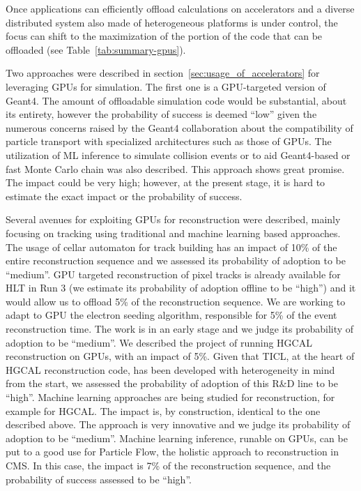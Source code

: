 \documentclass{cmspaper}
\begin{document}
Once applications can efficiently offload calculations on accelerators  and a diverse distributed system also made of heterogeneous platforms is under control, the focus can shift to the maximization of the portion of the code that can be offloaded (see Table~\ref{tab:summary-gpus}).

Two approaches were described in section~\ref{sec:usage_of_accelerators} for leveraging GPUs for simulation. The first one is a GPU-targeted version of Geant4. The amount of offloadable simulation code would be substantial, about its entirety, however the probability of success is deemed ``low'' given the numerous concerns raised by the Geant4 collaboration about the compatibility of particle transport with specialized architectures such as those of GPUs. The utilization of ML inference to simulate collision events or to aid Geant4-based or fast Monte Carlo chain was also described. This approach shows great promise. The impact could be very high; however, at the present stage, it is hard to estimate the exact impact or the probability of success.

Several avenues for exploiting GPUs for reconstruction were described, mainly focusing on tracking using traditional and machine learning based approaches. The usage of cellar automaton for track building has an impact of 10\% of the entire reconstruction sequence and we assessed its probability of adoption to be ``medium''. GPU targeted reconstruction of pixel tracks is already available for HLT in Run 3 (we estimate its probability of adoption offline to be ``high'') and it would allow us to offload 5\% of the reconstruction sequence. We are working to adapt to GPU the electron seeding algorithm, responsible for 5\% of the event reconstruction time. The work is in an early stage and we judge its probability of adoption to be ``medium''. We described the project of running HGCAL reconstruction on GPUs, with an impact of 5\%. Given that TICL, at the heart of HGCAL reconstruction code, has been developed with heterogeneity in mind from the start, we assessed the probability of adoption of this R\&D line to be ``high''. 
Machine learning approaches are being studied for reconstruction, for example for HGCAL. The impact is, by construction, identical to the one described above. The approach is very innovative and we judge its probability of adoption to be ``medium''. Machine learning inference, runable on GPUs, can be put to a good use for Particle Flow, the holistic approach to reconstruction in CMS. In this case, the impact is 7\% of the reconstruction sequence, and the probability of success assessed to be ``high''. 
\end{document}
